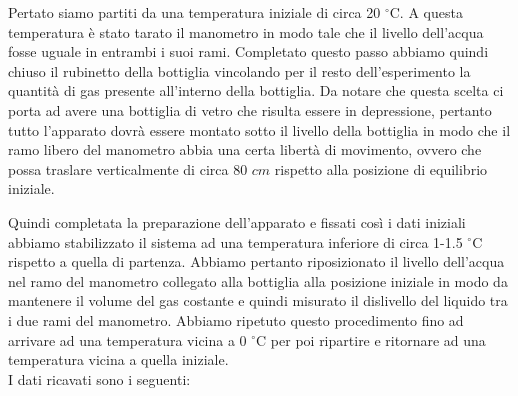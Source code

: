 Pertato siamo partiti da una temperatura iniziale di circa 20 $^\circ$C. A questa temperatura è stato tarato il manometro in modo tale che il livello dell'acqua fosse uguale in entrambi i suoi rami. Completato questo passo abbiamo quindi chiuso il rubinetto della bottiglia vincolando per il resto dell'esperimento la quantità di gas presente all'interno della bottiglia. Da notare che questa scelta ci porta ad avere una bottiglia di vetro che risulta essere in depressione, pertanto tutto l'apparato dovrà essere montato sotto il livello della bottiglia in modo che il ramo libero del manometro abbia una certa libertà di movimento, ovvero che possa traslare verticalmente di circa 80 $cm$ rispetto alla posizione di equilibrio iniziale.

Quindi completata la preparazione dell'apparato e fissati così i dati iniziali abbiamo stabilizzato il sistema ad una temperatura inferiore di circa 1-1.5 $^\circ$C rispetto a quella di partenza. Abbiamo pertanto riposizionato il livello dell'acqua nel ramo del manometro collegato alla bottiglia alla posizione iniziale in modo da mantenere il volume del gas costante e quindi misurato il dislivello del liquido tra i due rami del manometro.
Abbiamo ripetuto questo procedimento fino ad arrivare ad una temperatura vicina a 0 $^\circ$C per poi ripartire e ritornare ad una temperatura vicina a quella iniziale.\\

I dati ricavati sono i seguenti:

